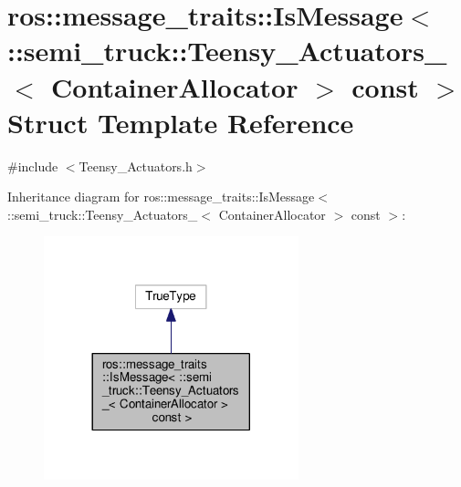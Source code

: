 \hypertarget{structros_1_1message__traits_1_1_is_message_3_01_1_1semi__truck_1_1_teensy___actuators___3_01_cobc29fbe598d16bac74a311be55406c9e}{}\section{ros\+:\+:message\+\_\+traits\+:\+:Is\+Message$<$ \+:\+:semi\+\_\+truck\+:\+:Teensy\+\_\+\+Actuators\+\_\+$<$ Container\+Allocator $>$ const $>$ Struct Template Reference}
\label{structros_1_1message__traits_1_1_is_message_3_01_1_1semi__truck_1_1_teensy___actuators___3_01_cobc29fbe598d16bac74a311be55406c9e}


{\ttfamily \#include $<$Teensy\+\_\+\+Actuators.\+h$>$}



Inheritance diagram for ros\+:\+:message\+\_\+traits\+:\+:Is\+Message$<$ \+:\+:semi\+\_\+truck\+:\+:Teensy\+\_\+\+Actuators\+\_\+$<$ Container\+Allocator $>$ const $>$\+:\nopagebreak
\begin{figure}[H]
\begin{center}
\leavevmode
\includegraphics[width=209pt]{structros_1_1message__traits_1_1_is_message_3_01_1_1semi__truck_1_1_teensy___actuators___3_01_co7825622c43c361e8e6549116ac595292}
\end{center}
\end{figure}


